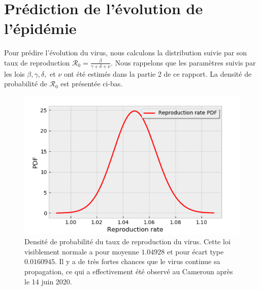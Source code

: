 \documentclass[
  french,
	10pt, %
]{fphw}
\begin{document}
\section{Prédiction de l'évolution de l'épidémie}

Pour prédire l'évolution du virus, nous calculons la distribution suivie par son taux de reproduction $\mathcal{R}_0 = \frac{\beta}{\gamma + \delta + \nu}$. Nous rappelons que les paramètres suivis par les lois $\beta, \gamma, \delta, $ et $\nu$ ont été estimés dans la partie 2 de ce rapport. La densité de probabilité de $\mathcal{R}_0$ est présentée ci-bas.
\begin{figure}[H]
  \centering
  \includegraphics[width=0.5\linewidth]{r0.png}
  \caption{Densité de probabilité du taux de reproduction du virus. Cette loi visiblement normale a pour moyenne $1.04928$ et pour écart type $0.0160945$. Il y a de très fortes chances que le virus continue sa propagation, ce qui a effectivement été observé au Cameroun après le 14 juin 2020.}
  \label{fig:pdf}
\end{figure}
\end{document}
